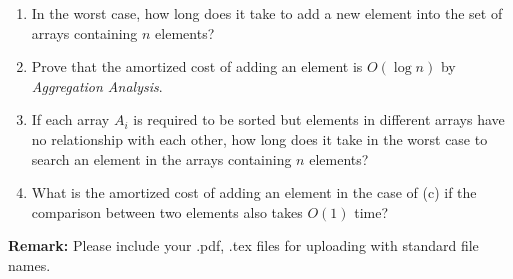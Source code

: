 \documentclass[12pt,a4paper]{article}
\theoremstyle{definition}
\begin{document}
\begin{enumerate}
    \begin{enumerate}
        \item In the worst case, how long does it take to add a new element into the set of arrays containing $n$ elements?
        \item Prove that the amortized cost of adding an element is $O(\log n)$ by \emph{Aggregation Analysis}.
        \item If each array $A_i$ is required to be sorted but elements in different arrays have no relationship with each other, how long does it take in the worst case to search an element in the arrays containing $n$ elements? 
\item What is the amortized cost of adding an element in the case of (c) if the comparison between two elements also takes $O(1)$ time?
    \end{enumerate}
	
\end{enumerate}



\textbf{Remark:} Please include your .pdf, .tex files for uploading with standard file names.


\end{document}
